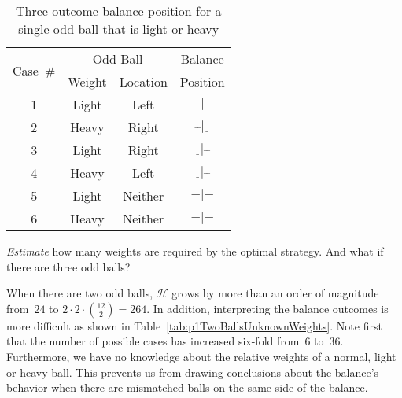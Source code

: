   \begin{table}[H]
    \centering
    \caption{Three-outcome balance position for a \\single odd ball that is light or heavy}\label{tab:p1OneBallTable}
    \begin{tabular}{|c||c|c||c|}
      \hline
      \multirow{2}{*}{Case~\#} &  \multicolumn{2}{c||}{Odd Ball} & Balance\\\cline{2-3}
      &  Weight  &  Location &  Position  \\ \hline\hline
      1   &  Light   &  Left     &  $\bar{~}\bar{~}|\underline{~~}$ \\ \hline
      2   &  Heavy   &  Right    &  $\bar{~}\bar{~}|\underline{~~}$ \\ \hline\hline
      3   &  Light   &  Right    &  $\underline{~~}|\bar{~}\bar{~}$ \\ \hline
      4   &  Heavy   &  Left     &  $\underline{~~}|\bar{~}\bar{~}$ \\ \hline\hline
      5   &  Light   &  Neither  &  $-|-$ \\ \hline
      6   &  Heavy   &  Neither  &  $-|-$ \\ \hline
    \end{tabular}
  \end{table}


\begin{subproblem}
  \textit{Estimate} how many weights are required by the optimal strategy.  And what if there are three odd balls?
\end{subproblem}

  When there are two odd balls, $\mathcal{H}$ grows by more than an order of magnitude from~$24$ to ${2\cdot2\cdot\binom{12}{2} = 264}$. In addition, interpreting the balance outcomes is more difficult as shown in Table~\ref{tab:p1TwoBallsUnknownWeights}.  Note first that the number of possible cases has increased six-fold from~6 to~36.  Furthermore, we have no knowledge about the relative weights of a normal, light or heavy ball.  This prevents us from drawing conclusions about the balance's behavior when there are mismatched balls on the same side of the balance.
  
